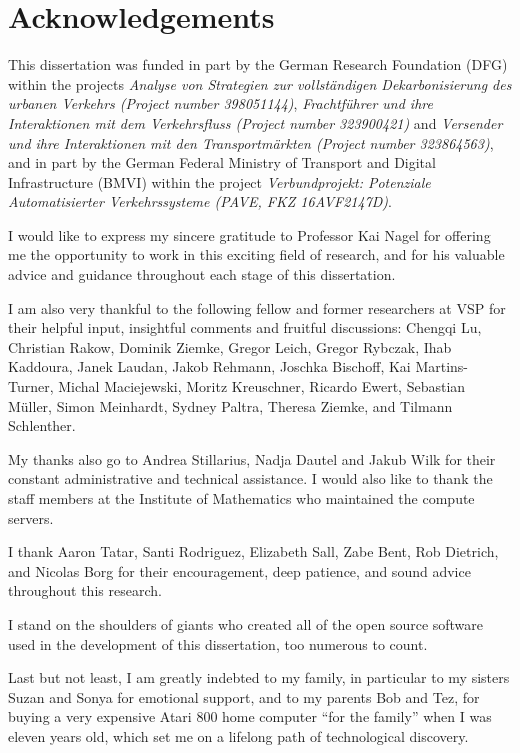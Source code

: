 
\thispagestyle{empty}

\chapter*{Acknowledgements}

This dissertation was funded in part by the German Research Foundation (DFG) within the projects
\emph{Analyse von Strategien zur vollständigen Dekarbonisierung des urbanen Verkehrs (Project number 398051144)},
\emph{Frachtführer und ihre Interaktionen mit dem Verkehrsfluss (Project number 323900421)} and
\emph{Versender und ihre Interaktionen mit den Transportmärkten (Project number 323864563)},
and in part by the German Federal Ministry of Transport and Digital Infrastructure (BMVI) within the project
\emph{Verbundprojekt: Potenziale Automatisierter Verkehrssysteme (PAVE, FKZ 16AVF2147D)}.

I would like to express my sincere gratitude to Professor Kai Nagel for offering me the opportunity to work in this exciting field of research, and for his valuable advice and guidance throughout each stage of this dissertation.

I am also very thankful to the following fellow and former researchers at VSP for their helpful input, insightful comments and fruitful discussions:
Chengqi Lu,
Christian Rakow,
Dominik Ziemke,
Gregor Leich,
Gregor Rybczak,
Ihab Kaddoura,
Janek Laudan,
Jakob Rehmann,
Joschka Bischoff,
Kai Martins-Turner,
Michal Maciejewski,
Moritz Kreuschner,
Ricardo Ewert,
Sebastian Müller,
Simon Meinhardt,
Sydney Paltra,
Theresa Ziemke,
and Tilmann Schlenther.

My thanks also go to Andrea Stillarius, Nadja Dautel and Jakub Wilk for their constant administrative and technical assistance. I would also like to thank the staff members at the Institute of Mathematics who maintained the compute servers.

I thank Aaron Tatar, Santi Rodriguez, Elizabeth Sall, Zabe Bent, Rob Dietrich, and Nicolas Borg for their encouragement, deep patience, and sound advice throughout this research.

I stand on the shoulders of giants who created all of the open source software used in the development of this dissertation, too numerous to count.

Last but not least, I am greatly indebted to my family, in particular to my sisters Suzan and Sonya for emotional support, and to my parents Bob and Tez, for buying a very expensive Atari 800 home computer ``for the family'' when I was eleven years old, which set me on a lifelong path of technological discovery.

\newpage
